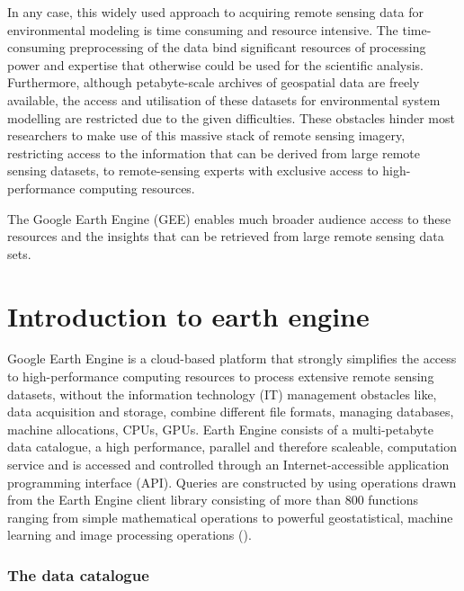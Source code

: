 In any case, this widely used approach to acquiring remote sensing data for environmental modeling is time consuming and resource intensive.
The time-consuming preprocessing of the data bind significant resources of processing power and expertise that otherwise could be used for the scientific analysis. Furthermore, although petabyte-scale archives of geospatial data are freely available, the access and utilisation of these datasets for environmental system modelling are restricted due to the given difficulties. 
These obstacles hinder most researchers to make use of this massive stack of remote sensing imagery, restricting access to the information that can be derived from large remote sensing datasets, to remote-sensing experts with exclusive access to high-performance computing resources.

The Google Earth Engine (GEE) enables much broader audience access to these resources and the insights that can be retrieved from large remote sensing data sets.

\section{Introduction to earth engine}

Google Earth Engine is a cloud-based platform that strongly simplifies the access to high-performance computing resources to process extensive remote sensing datasets, without the information technology (IT) management obstacles like, data acquisition and storage, combine different file formats, managing databases, machine allocations, CPUs, GPUs. 
Earth Engine consists of a multi-petabyte data catalogue, a high performance, parallel and therefore scaleable, computation service and is accessed and controlled through an Internet-accessible application programming interface (API).  Queries are constructed by using operations drawn from the Earth Engine client library consisting of more than 800 functions ranging from simple mathematical operations to powerful geostatistical, machine learning and image processing operations (\cite{gorelick2017google}).

\subsubsection{The data catalogue}

